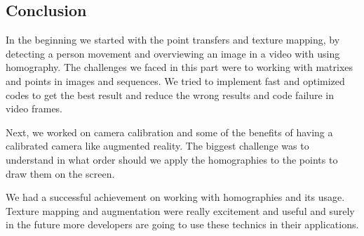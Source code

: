 \subsection{Conclusion}
In the beginning we started with the point transfers and texture mapping, by detecting a person movement and overviewing an image in a video with using homography. The challenges we faced in this part were to working with matrixes and points in images and sequences. We tried to implement fast and optimized codes to get the best result and reduce the wrong results and code failure in video frames.

Next, we worked on camera calibration and some of the beneﬁts of having a calibrated camera like augmented reality. The biggest challenge was to understand in what order should we apply the homographies to the points to draw them on the screen.

We had a successful achievement on working with homographies and its usage. Texture mapping and augmentation were really excitement and useful and surely in the future more developers are going to use these technics in their applications.

